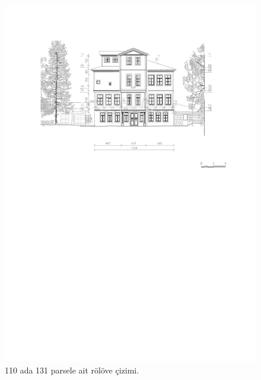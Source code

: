 \begin{figure}
\centering
\includegraphics[width=1\textwidth,height=\textheight]{source/figures/Roloveler/R110-131.pdf}
\caption{110 ada 131 parsele ait rölöve çizimi.}
\end{figure}

